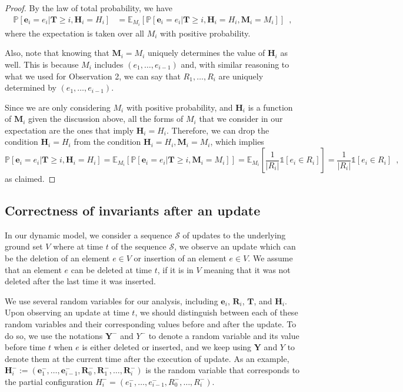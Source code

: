\documentclass[11pt]{article}
\renewcommand{\Pr}[1]{\ensuremath{\mathbb{P}\left[#1\right]}}
\newcommand{\Exu}[2]{\ensuremath{\mathbb{E}_{#1}\left[#2\right]}}
\newcommand{\ind}[1]{\ensuremath{\mathds{1}\left[#1\right]}}
\newcommand{\bR}{\ensuremath{\mathbf{R}}}
\newcommand{\bE}{\ensuremath{\mathbf{e}}}
\newcommand{\bT}{\ensuremath{\mathbf{T}}}
\newcommand{\bM}{\ensuremath{\mathbf{M}}}
\newcommand{\bH}{\ensuremath{\mathbf{H}}}
\newcommand{\bY}{\ensuremath{\mathbf{Y}}}
\begin{document}
\begin{proof}
    By the law of total probability, we have 
    \begin{align*}
        \Pr{\bE_i = e_i | 
        \bT \ge i,
        \bH_i = H_i
        }
        &=
        \Exu{M_i}{
        \Pr{\bE_i = e_i | 
        \bT \ge i,
        \bH_i = H_i,
        \bM_i=M_i
        }
        } \enspace, 
    \end{align*}
    where the expectation is taken over all $M_i$ with positive probability.

    Also, note that knowing that $\bM_i = M_i$ uniquely determines the value of $\bH_i$ as well. This is because $M_i$ includes $(e_1, \dots, e_{i-1})$ and, with similar reasoning to what we used for Observation 2, we can say that $R_1, \dots, R_{i}$ are uniquely determined by $(e_1, \dots, e_{i-1})$.
    
Since we are only considering $M_i$ with positive probability, and $\bH_i$ is a function of $\bM_i$ given the discussion above, all the forms of $M_i$ that we consider in our expectation are the ones that imply $\bH_i = H_i$. Therefore, we can drop the condition $\bH_i=H_i$ from the condition $\bH_i=H_i, \bM_i = M_i$, which implies
\[
        \Pr{\bE_i = e_i | \bT \ge i, \bH_i = H_i }
        = \Exu{M_i}{ \Pr{\bE_i = e_i | \bT \ge i, \bM_i=M_i} }
        = \Exu{M_i}{ \frac{1}{|R_i|} \ind{e_i \in R_i} }
        =\frac{1}{|R_i|} \ind{e_i \in R_i} \enspace ,
\]
    as claimed.
\end{proof}




\subsection{Correctness of invariants after an update}
\label{sec:update:matroid}
In our dynamic model, 
we consider a sequence $\mathcal{S}$ of updates to the underlying ground set $V$ 
where at time $t$ of the sequence $\mathcal{S}$, we observe an update which can be the deletion of an element $e \in V$ or insertion of an element $e \in V$. 
We assume that an element $e$ can be deleted at time $t$, if it is in $V$ meaning that it was not deleted after the last time it was inserted. 


We use several random variables for our analysis, including $\bE_i$, $\bR_i$, $\bT$, and $\bH_i$. Upon observing an update at time $t$, 
we should distinguish between each of these random variables and their corresponding values before and after the update.
To do so, we use the notations $\bY^-$ and $Y^{-}$ to denote a random variable and its value before time $t$ when $e$ is either deleted or inserted, and we keep using $\bY$ and $Y$ to denote them at the current time after the execution of update.
As an example,
    $\bH_i^- := (\bE_1^-, \dots, \bE_{i-1}^-, \bR_0^-,  \bR_{1}^-, \dots, \bR_{i}^-)$ 
    is the random variable that corresponds to the partial configuration $H_i^- = (e_1^-, \dots, e_{i-1}^-, R_0^-, \dots, R_{i}^-)$.
\end{document}
